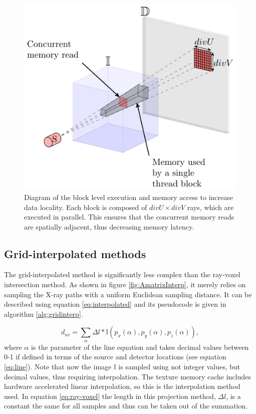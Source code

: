 \begin{figure}
\begin{center}

\includegraphics{GPUmethods/threadblocks-figure0.pdf} 
\end{center}

\caption[Diagram of trheadblock optimized kernel execution]{\label{fig:block} Diagram of the block level execution and memory access to increase data locality. Each block is composed of $divU\times divV$ rays, which are executed in parallel. This ensures that the concurrent memory reads are spatially adjacent, thus decreasing memory latency.} 
\end{figure}




\subsection{Grid-interpolated methods}

The grid-interpolated method is significantly less complex than the ray-voxel intersection method. As shown in figure \ref{fig:AmatrixInterp}, it merely relies on sampling the X-ray paths with a uniform Euclidean sampling distance. It can be described using equation \ref{eq:interpolated} and its pseudocode is given in algorithm \ref{alg:gridinterp}.

\begin{equation}
d_{uv}= \sum_{\alpha}\Delta l*\mathbb{I}(p_x(\alpha),p_y(\alpha),p_z(\alpha)),
\label{eq:interpolated}
\end{equation}
where $\alpha$ is the parameter of the line equation and takes decimal values between 0-1 if defined in terms of the source and detector locations (see equation \ref{eq:line}). Note that now the image $\mathbb{I}$ is sampled using not integer values, but decimal values, thus requiring interpolation. The texture memory cache includes hardware accelerated linear interpolation, so this is the interpolation method used. In equation \ref{eq:ray-voxel} the length in this projection method, $\Delta l$, is a constant the same for all samples and thus can be taken out of the summation.

